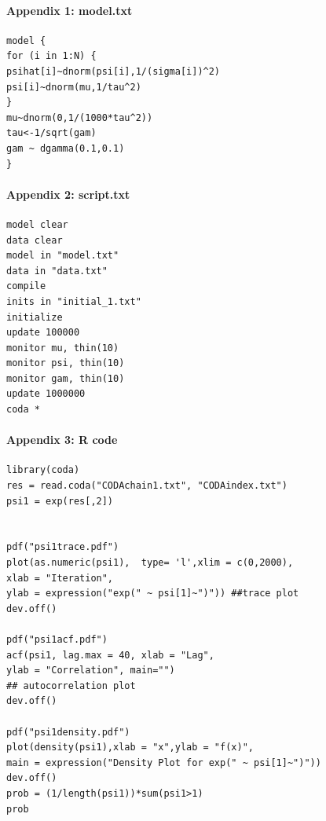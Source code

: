 \documentclass[12pt, leqno]{article}
\begin{document}
\pagebreak

\paragraph{Appendix 1: model.txt}
\begin{verbatim}
model {
for (i in 1:N) {
psihat[i]~dnorm(psi[i],1/(sigma[i])^2)
psi[i]~dnorm(mu,1/tau^2)
}
mu~dnorm(0,1/(1000*tau^2))
tau<-1/sqrt(gam)
gam ~ dgamma(0.1,0.1)
}
\end{verbatim}

\paragraph{Appendix 2: script.txt}
\begin{verbatim}
model clear
data clear
model in "model.txt"
data in "data.txt"
compile
inits in "initial_1.txt"
initialize
update 100000
monitor mu, thin(10)
monitor psi, thin(10)
monitor gam, thin(10)
update 1000000
coda *
\end{verbatim}

\paragraph{Appendix 3: R code}

\begin{verbatim}
library(coda)
res = read.coda("CODAchain1.txt", "CODAindex.txt")
psi1 = exp(res[,2])


pdf("psi1trace.pdf")
plot(as.numeric(psi1),  type= 'l',xlim = c(0,2000),
xlab = "Iteration", 
ylab = expression("exp(" ~ psi[1]~")")) ##trace plot
dev.off()

pdf("psi1acf.pdf")
acf(psi1, lag.max = 40, xlab = "Lag", 
ylab = "Correlation", main="")
## autocorrelation plot
dev.off()

pdf("psi1density.pdf")
plot(density(psi1),xlab = "x",ylab = "f(x)", 
main = expression("Density Plot for exp(" ~ psi[1]~")"))
dev.off()
prob = (1/length(psi1))*sum(psi1>1)
prob
\end{verbatim}
\end{document}
